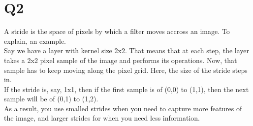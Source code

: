 \documentclass{article}
\begin{document}
\section{Q2}
A stride is the space of pixels by which a filter moves accross an image. To explain, an example.\\
Say we have a layer with kernel size 2x2. That means that at each step, the layer takes a 2x2 pixel sample of the image and performs its operations. Now, that sample has to keep moving along the pixel grid. Here, the size of the stride steps in.\\
If the stride is, say, 1x1, then if the first sample is of (0,0) to (1,1), then the next sample will be of (0,1) to (1,2).\\
As a result, you use smalled strides when you need to capture more features of the image, and larger strides for when you need less information.
\end{document}
